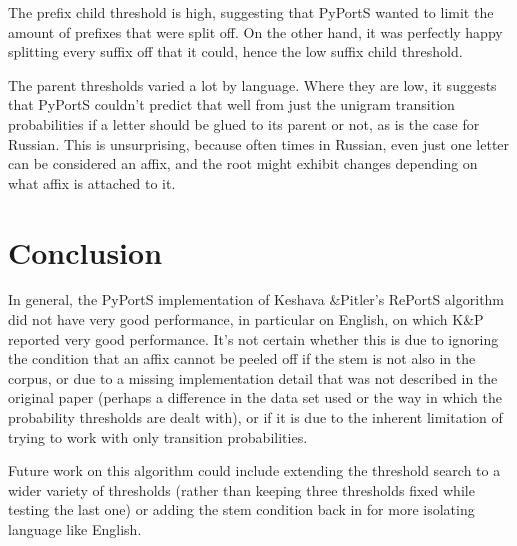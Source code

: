 \documentclass[paper=a4, fontsize=11pt]{article}
\begin{document}
The prefix child threshold is high, suggesting that PyPortS wanted to limit the amount of prefixes that were split off. On the other hand, it was perfectly happy splitting every suffix off that it could, hence the low suffix child threshold. 

The parent thresholds varied a lot by language. Where they are low, it suggests that PyPortS couldn't predict that well from just the unigram transition probabilities if a letter should be glued to its parent or not, as is the case for Russian. This is unsurprising, because often times in Russian, even just one letter can be considered an affix, and the root might exhibit changes depending on what affix is attached to it.

\section{Conclusion}

In general, the PyPortS implementation of Keshava \&Pitler's RePortS algorithm did not have very good performance, in particular on English, on which K\&P reported very good performance. It's not certain whether this is due to ignoring the condition that an affix cannot be peeled off if the stem is not also in the corpus, or due to a missing implementation detail that was not described in the original paper (perhaps a difference in the data set used or the way in which the probability thresholds are dealt with), or if it is due to the inherent limitation of trying to work with only transition probabilities.

Future work on this algorithm could include extending the threshold search to a wider variety of thresholds (rather than keeping three thresholds fixed while testing the last one) or adding the stem condition back in for more isolating language like English.



\end{document}
